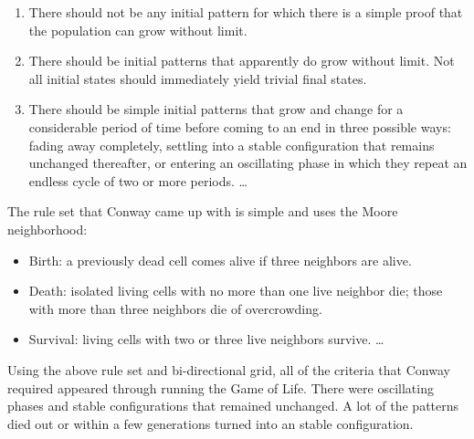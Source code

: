 \begin{enumerate}
	\item There should not be any initial pattern for which there is a simple proof that the population can grow without limit.
	\item There should be initial patterns that apparently do grow without limit. Not all initial states should immediately yield trivial final states.
	\item There should be simple initial patterns that grow and change for a considerable period of time before coming to an end in three possible ways: fading away completely, settling into a stable configuration that remains unchanged thereafter, or entering an oscillating phase in which they repeat an endless cycle of two or more periods.
	\dots
\end{enumerate}

The rule set that Conway came up with is simple and uses the Moore neighborhood:
\begin{itemize}
    \item Birth: a previously dead cell comes alive if three neighbors are alive.
    \item Death: isolated living cells with no more than one live neighbor die; those with more than three neighbors die of overcrowding.
    \item Survival: living cells with two or three live neighbors survive.
	\dots
\end{itemize}

Using the above rule set and bi-directional grid, all of the criteria that Conway required appeared through running the Game of Life. There were oscillating phases and stable configurations that remained unchanged. A lot of the patterns died out or within a few generations turned into an stable configuration.

